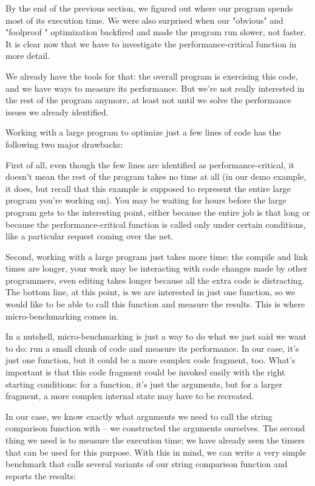 
By the end of the previous section, we figured out where our program spends most of its execution time. We were also surprised when our "obvious" and "foolproof " optimization backfired and made the program run slower, not faster. It is clear now that we have to investigate the performance-critical function in more detail.

We already have the tools for that: the overall program is exercising this code, and we have ways to measure its performance. But we're not really interested in the rest of the program anymore, at least not until we solve the performance issues we already identified. 

Working with a large program to optimize just a few lines of code has the following two major drawbacks:

First of all, even though the few lines are identified as performance-critical, it doesn't mean the rest of the program takes no time at all (in our demo example, it does, but recall that this example is supposed to represent the entire large program you're working on). You may be waiting for hours before the large program gets to the interesting point, either because the entire job is that long or because the performance-critical function is called only under certain conditions, like a particular request coming over the net.

Second, working with a large program just takes more time: the compile and link times are longer, your work may be interacting with code changes made by other programmers, even editing takes longer because all the extra code is distracting. The bottom line, at this point, is we are interested in just one function, so we would like to be able to call this function and measure the results. This is where micro-benchmarking comes in.


In a nutshell, micro-benchmarking is just a way to do what we just said we want to do: run a small chunk of code and measure its performance. In our case, it's just one function, but it could be a more complex code fragment, too. What's important is that this code fragment could be invoked easily with the right starting conditions: for a function, it's just the arguments, but for a larger fragment, a more complex internal state may have to be recreated.

In our case, we know exactly what arguments we need to call the string comparison function with – we constructed the arguments ourselves. The second thing we need is to measure the execution time; we have already seen the timers that can be used for this purpose. With this in mind, we can write a very simple benchmark that calls several variants of our string comparison function and reports the results:

